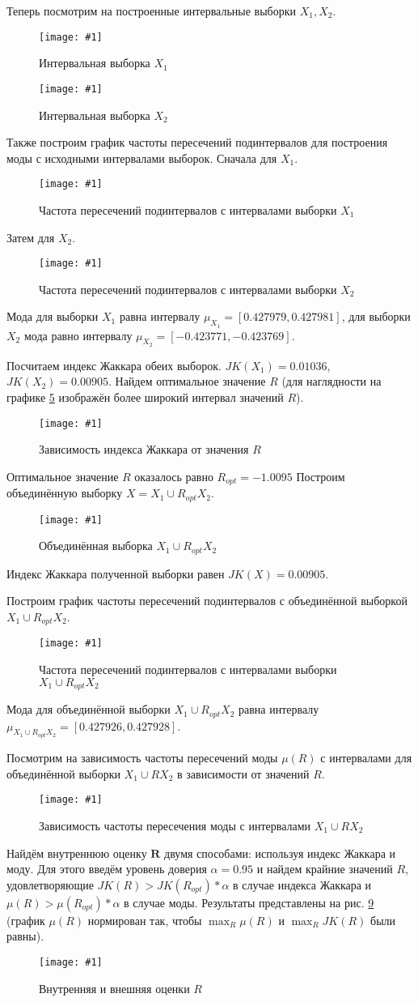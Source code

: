 \documentclass[a4paper,12pt]{article}
\newcommand{\plot}[3]{
    \begin{figure}[H]
        \begin{center}
            \texttt{[image: \#1]}
            \caption{#2}
            \label{#3}
        \end{center}
    \end{figure}
}
\begin{document}
    Теперь посмотрим на построенные интервальные выборки $ X_1, X_2 $.
    \plot{_X1}{Интервальная выборка $ X_1 $}{p:x1}
    \plot{_X2}{Интервальная выборка $ X_2 $}{p:x2}

    Также построим график частоты пересечений подинтервалов для построения моды с исходными интервалами выборок.
    Сначала для $ X_1 $.
    \plot{_ModaX1Hist}{Частота пересечений подинтервалов с интервалами выборки $ X_1 $}{p:modaX1}

    Затем для $ X_2 $.
    \plot{_ModaX2Hist}{Частота пересечений подинтервалов с интервалами выборки $ X_2 $}{p:modaX2}

    Мода для выборки $ X_1 $ равна интервалу $ \mu_{X_1} = [0.427979, 0.427981] $,
    для выборки $ X_2 $ мода равно интервалу $ \mu_{X_2} = [-0.423771, -0.423769] $.

    Посчитаем индекс Жаккара обеих выборок. $ JK(X_1) = 0.01036 $, $ JK(X_2) = 0.00905 $.
    Найдем оптимальное значение $ R $
    (для наглядности на графике \ref{p:jaccard} изображён более широкий интервал значений $ R $).
    \plot{_Jaccard}{Зависимость индекса Жаккара от значения $R$}{p:jaccard}

    Оптимальное значение $ R $ оказалось равно $ R_{opt} = -1.0095 $
    Построим объединённую выборку $ X = X_1 \cup R_{opt} X_2 $.
    \plot{_X1RX2}{Объединённая выборка $ X_1 \cup R_{opt} X_2 $}{p:x1rx2}

    Индекс Жаккара полученной выборки равен $ JK(X) = 0.00905 $.

    Построим график частоты пересечений подинтервалов с объединённой выборкой
    $ X_1 \cup R_{opt} X_2 $.
    \plot{_ModaX1RX2Hist}{Частота пересечений подинтервалов с интервалами выборки $ X_1 \cup R_{opt} X_2 $}{p:moadX2RX2}

    Мода для объединённой выборки $ X_1 \cup R_{opt} X_2 $ равна интервалу $ \mu_{X_1 \cup R_{opt} X_2} =  [0.427926, 0.427928] $.

    Посмотрим на зависимость частоты пересечений моды $ \mu(R) $ с интервалами
    для объединённой выборки $ X_1 \cup R X_2 $ в зависимости от значений $ R $.
    \plot{_ModaR}{Зависимость частоты пересечения моды с интервалами $ X_1 \cup R X_2 $}{p:modaR}

    Найдём внутреннюю оценку $ \textbf{R} $ двумя способами: используя индекс Жаккара и моду.
    Для этого введём уровень доверия $ \alpha = 0.95 $ и найдем крайние значений $ R $,
    удовлетворяющие $ JK(R) > JK(R_{opt}) * \alpha $ в случае индекса Жаккара
    и $ \mu(R) > \mu(R_{opt}) * \alpha $ в случае моды.
    Результаты представлены на рис. \ref{p:InnerOuter}
    (график $ \mu(R) $ нормирован так, чтобы $ \max_R{\mu(R)} $ и $ \max_R{JK(R)} $ были равны).
    \plot{_InnerOuter}{Внутренняя и внешняя оценки $ R $}{p:InnerOuter} 
\end{document}
